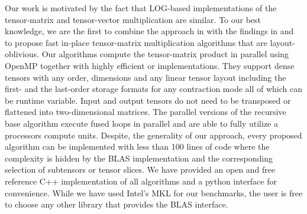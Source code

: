 Our work is motivated by the fact that LOG-based implementations of the tensor-matrix and tensor-vector multiplication are similar. 
To our best knowledge, we are the first to combine the approach in \cite{bassoy:2019:ttv} with the findings in \cite{li:2015:input} and to propose fast in-place tensor-matrix multiplication algorithms that are layout-oblivious.
Our algorithms compute the tensor-matrix product in parallel using OpenMP together with highly efficient  or  implementations.
They support dense tensors with any order, dimensions and any linear tensor layout including the first- and the last-order storage formats for any contraction mode all of which can be runtime variable.
Input and output tensors do not need to be transposed or flattened into two-dimensional matrices.
The parallel versions of the recursive base algorithm execute fused loops in parallel and are able to fully utilize a processors compute units.
Despite, the generality of our approach, every proposed algorithm can be implemented with less than 100 lines of  code where the complexity is hidden by the BLAS implementation and the corresponding selection of subtensors or tensor slices.
We have provided an open and free reference C++ implementation of all algorithms and a python interface for convenience.
While we have used Intel's MKL for our benchmarks, the user is free to choose any other library that provides the BLAS interface.

